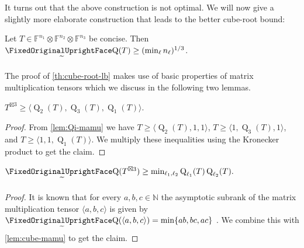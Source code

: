 \documentclass[11pt]{article}
\makeatletter
\DeclareMathOperator{\subrank}{Q}
\newcommand{\FF}{\mathbb{F}}
\newcommand{\NN}{\mathbb{N}}
\edef\FixedOriginalLowerTilde{\noexpand\mathchar\number\numexpr\symlargesymbols*256+101\relax}
\newcommand{\FixedQGlyphStyle}[2]{\begingroup\setbox0=\hbox{$\m@th#1\text{\normalfont\FixedOriginalUprightFace Q}$}\setbox2=\hbox{$\m@th#1\FixedOriginalLowerTilde$}\dimen0=\dp0\advance\dimen0 by\ht2\advance\dimen0 by1.23pt\typeout{FIXEDGLYPH Q STYLE\meaning#1 BASEwidth=\the\wd0 BASEheight=\the\ht0 BASEdepth=\the\dp0 TILDEwidth=\the\wd2 TILDEheight=\the\ht2 TILDEdepth=\the\dp2 LOWER=\the\dimen0}\hbox{\rlap{\hbox to\wd0{\hss\lower\dimen0\copy2\hss}}\box0}\endgroup}
\DeclareMathOperator{\asympsubrank}{\mathpalette\FixedQGlyphStyle\relax}
\makeatother
\begin{document}
%

It turns out that the above construction is not optimal. We will now give a slightly more elaborate construction that leads to the better cube-root bound:

\begin{theorem}\label{th:cube-root-lb}
    Let $T \in \FF^{n_1} \otimes \FF^{n_2} \otimes \FF^{n_3}$ be concise. Then $\asympsubrank(T) \geq (\min_{\ell} n_\ell)^{1/3}$.
\end{theorem}

The proof of \autoref{th:cube-root-lb} makes use of basic properties of matrix multiplication tensors which we discuss in the following two lemmas. 

\begin{lemma}\label{lem:cube-mamu}
    $T^{\boxtimes 3} \geq \langle \subrank_2(T),\subrank_3(T),\subrank_1(T) \rangle.$
\end{lemma}

\begin{proof}
    From \autoref{lem:Qi-mamu} we have %
    $T \geq \langle \subrank_2(T),1,1\rangle$, 
    $T \geq \langle 1,\subrank_3(T),1\rangle$, and  
    $T \geq \langle 1,1,\subrank_1(T)\rangle$.
We multiply these inequalities using the Kronecker product to get the claim.
\end{proof}


\begin{lemma}\label{lem:asympsub-min}
    $\asympsubrank(T^{\boxtimes 3}) \geq \min_{{\ell_1},{\ell_2}} \subrank_{\ell_1}(T) \subrank_{\ell_2}(T).$
\end{lemma}
\begin{proof}
    It is known that for every $a,b,c \in \NN$ the asymptotic subrank of the matrix multiplication tensor $\langle a,b,c\rangle$ is given by $\asympsubrank(\langle a,b,c\rangle) = \min \{ab, bc, ac\}$ \cite[Equation~4.6]{strassen1988asymptotic}. We combine this with \autoref{lem:cube-mamu} to get the claim.
\end{proof}
\end{document}
